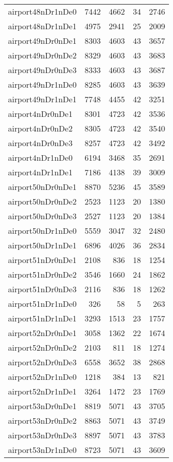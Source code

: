 \begin{longtable}{lrrrr}
airport48nDr1nDe0 & 7442 & 4662 & 34 & 2746 \\
airport48nDr1nDe1 & 4975 & 2941 & 25 & 2009 \\
airport49nDr0nDe1 & 8303 & 4603 & 43 & 3657 \\
airport49nDr0nDe2 & 8329 & 4603 & 43 & 3683 \\
airport49nDr0nDe3 & 8333 & 4603 & 43 & 3687 \\
airport49nDr1nDe0 & 8285 & 4603 & 43 & 3639 \\
airport49nDr1nDe1 & 7748 & 4455 & 42 & 3251 \\
airport4nDr0nDe1 & 8301 & 4723 & 42 & 3536 \\
airport4nDr0nDe2 & 8305 & 4723 & 42 & 3540 \\
airport4nDr0nDe3 & 8257 & 4723 & 42 & 3492 \\
airport4nDr1nDe0 & 6194 & 3468 & 35 & 2691 \\
airport4nDr1nDe1 & 7186 & 4138 & 39 & 3009 \\
airport50nDr0nDe1 & 8870 & 5236 & 45 & 3589 \\
airport50nDr0nDe2 & 2523 & 1123 & 20 & 1380 \\
airport50nDr0nDe3 & 2527 & 1123 & 20 & 1384 \\
airport50nDr1nDe0 & 5559 & 3047 & 32 & 2480 \\
airport50nDr1nDe1 & 6896 & 4026 & 36 & 2834 \\
airport51nDr0nDe1 & 2108 & 836 & 18 & 1254 \\
airport51nDr0nDe2 & 3546 & 1660 & 24 & 1862 \\
airport51nDr0nDe3 & 2116 & 836 & 18 & 1262 \\
airport51nDr1nDe0 & 326 & 58 & 5 & 263 \\
airport51nDr1nDe1 & 3293 & 1513 & 23 & 1757 \\
airport52nDr0nDe1 & 3058 & 1362 & 22 & 1674 \\
airport52nDr0nDe2 & 2103 & 811 & 18 & 1274 \\
airport52nDr0nDe3 & 6558 & 3652 & 38 & 2868 \\
airport52nDr1nDe0 & 1218 & 384 & 13 & 821 \\
airport52nDr1nDe1 & 3264 & 1472 & 23 & 1769 \\
airport53nDr0nDe1 & 8819 & 5071 & 43 & 3705 \\
airport53nDr0nDe2 & 8863 & 5071 & 43 & 3749 \\
airport53nDr0nDe3 & 8897 & 5071 & 43 & 3783 \\
airport53nDr1nDe0 & 8723 & 5071 & 43 & 3609 \\

\end{longtable}
